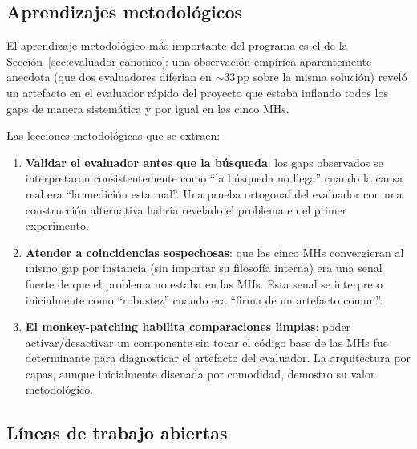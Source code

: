 \documentclass[11pt,a4paper]{article}
\theoremstyle{definition}
\theoremstyle{remark}
\begin{document}
\subsection{Aprendizajes metodológicos}

El aprendizaje metodológico más importante del programa es el de la
Sección~\ref{sec:evaluador-canonico}: una observación empírica
aparentemente anecdota (que dos evaluadores diferian en $\sim 33$\,pp
sobre la misma solución) reveló un artefacto en el evaluador rápido
del proyecto que estaba inflando todos los gaps de manera sistemática
y por igual en las cinco MHs.

Las lecciones metodológicas que se extraen:

\begin{enumerate}
\item \textbf{Validar el evaluador antes que la búsqueda}: los gaps
  observados se interpretaron consistentemente como ``la búsqueda no
  llega'' cuando la causa real era ``la medición esta mal''. Una
  prueba ortogonal del evaluador con una construcción alternativa
  habría revelado el problema en el primer experimento.
\item \textbf{Atender a coincidencias sospechosas}: que las cinco
  MHs convergieran al mismo gap por instancia (sin importar su
  filosofía interna) era una senal fuerte de que el problema no
  estaba en las MHs. Esta senal se interpreto inicialmente como
  ``robustez'' cuando era ``firma de un artefacto comun''.
\item \textbf{El monkey-patching habilita comparaciones limpias}:
  poder activar/desactivar un componente sin tocar el código base de
  las MHs fue determinante para diagnosticar el artefacto del
  evaluador. La arquitectura por capas, aunque inicialmente disenada
  por comodidad, demostro su valor metodológico.
\end{enumerate}

\subsection{Líneas de trabajo abiertas}
\end{document}
